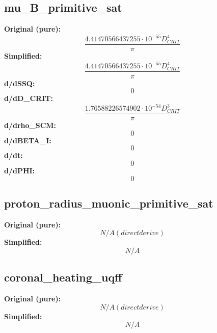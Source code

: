 \subsection{mu_B_primitive_sat}
\textbf{Original (pure):}
\begin{equation}
\frac{4.41470566437255 \cdot 10^{-55} D_{CRIT}^{4}}{\pi}
\end{equation}
\textbf{Simplified:}
\begin{equation}
\frac{4.41470566437255 \cdot 10^{-55} D_{CRIT}^{4}}{\pi}
\end{equation}
\textbf{d/dSSQ:}
\begin{equation}
0
\end{equation}
\textbf{d/dD_CRIT:}
\begin{equation}
\frac{1.76588226574902 \cdot 10^{-54} D_{CRIT}^{3}}{\pi}
\end{equation}
\textbf{d/drho_SCM:}
\begin{equation}
0
\end{equation}
\textbf{d/dBETA_I:}
\begin{equation}
0
\end{equation}
\textbf{d/dt:}
\begin{equation}
0
\end{equation}
\textbf{d/dPHI:}
\begin{equation}
0
\end{equation}

\subsection{proton_radius_muonic_primitive_sat}
\textbf{Original (pure):}
\begin{equation}
N/A (direct derive)
\end{equation}
\textbf{Simplified:}
\begin{equation}
N/A
\end{equation}

\subsection{coronal_heating_uqff}
\textbf{Original (pure):}
\begin{equation}
N/A (direct derive)
\end{equation}
\textbf{Simplified:}
\begin{equation}
N/A
\end{equation}

